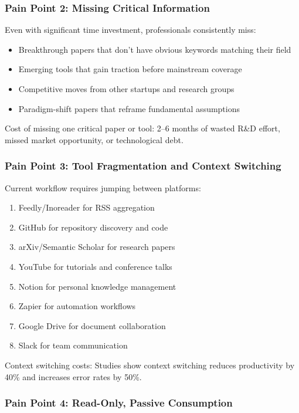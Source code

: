 \documentclass{report}
\begin{document}
\subsubsection{Pain Point 2: Missing Critical Information}

Even with significant time investment, professionals consistently miss:
\begin{itemize}
    \item Breakthrough papers that don't have obvious keywords matching their field
    \item Emerging tools that gain traction before mainstream coverage
    \item Competitive moves from other startups and research groups
    \item Paradigm-shift papers that reframe fundamental assumptions
\end{itemize}

Cost of missing one critical paper or tool: 2--6 months of wasted R\&D effort, missed market opportunity, or technological debt.

\subsubsection{Pain Point 3: Tool Fragmentation and Context Switching}

Current workflow requires jumping between platforms:
\begin{enumerate}
    \item Feedly/Inoreader for RSS aggregation
    \item GitHub for repository discovery and code
    \item arXiv/Semantic Scholar for research papers
    \item YouTube for tutorials and conference talks
    \item Notion for personal knowledge management
    \item Zapier for automation workflows
    \item Google Drive for document collaboration
    \item Slack for team communication
\end{enumerate}

Context switching costs: Studies show context switching reduces productivity by 40\% and increases error rates by 50\%.

\subsubsection{Pain Point 4: Read-Only, Passive Consumption}
\end{document}
